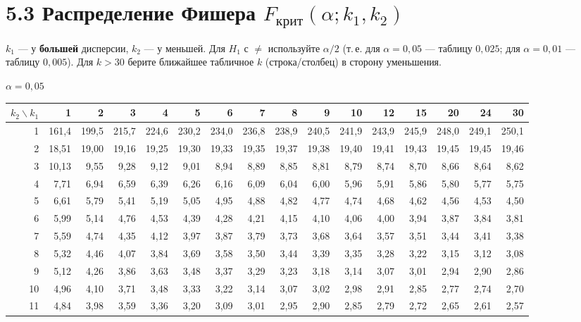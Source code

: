 \documentclass[a4paper,10pt]{extarticle}
\newcommand{\kr}{\text{крит}}\newcommand{\nab}{\text{набл}}
\begin{document}
\section*{5.3 Распределение Фишера $F_\kr(\alpha;k_1,k_2)$}
$k_1$ --- у \textbf{большей} дисперсии, $k_2$ --- у меньшей. Для $H_1$ с $\ne$ используйте $\alpha/2$ (т.\,е. для $\alpha=0{,}05$ --- таблицу $0{,}025$; для $\alpha=0{,}01$ --- таблицу $0{,}005$). Для $k>30$ берите ближайшее табличное $k$ (строка/столбец) в сторону уменьшения.\\
\scriptsize\renewcommand{\arraystretch}{0.86}\setlength{\tabcolsep}{2.6pt}
\begin{center}
\textbf{$\alpha=0{,}05$}\\[1pt]
\begin{tabular}{r|rrrrrrrrrrrrrrr}
$k_2\backslash k_1$ & 1 & 2 & 3 & 4 & 5 & 6 & 7 & 8 & 9 & 10 & 12 & 15 & 20 & 24 & 30\\\hline
1 & 161,4 & 199,5 & 215,7 & 224,6 & 230,2 & 234,0 & 236,8 & 238,9 & 240,5 & 241,9 & 243,9 & 245,9 & 248,0 & 249,1 & 250,1\\
2 & 18,51 & 19,00 & 19,16 & 19,25 & 19,30 & 19,33 & 19,35 & 19,37 & 19,38 & 19,40 & 19,41 & 19,43 & 19,45 & 19,45 & 19,46\\
3 & 10,13 & 9,55 & 9,28 & 9,12 & 9,01 & 8,94 & 8,89 & 8,85 & 8,81 & 8,79 & 8,74 & 8,70 & 8,66 & 8,64 & 8,62\\
4 & 7,71 & 6,94 & 6,59 & 6,39 & 6,26 & 6,16 & 6,09 & 6,04 & 6,00 & 5,96 & 5,91 & 5,86 & 5,80 & 5,77 & 5,75\\
5 & 6,61 & 5,79 & 5,41 & 5,19 & 5,05 & 4,95 & 4,88 & 4,82 & 4,77 & 4,74 & 4,68 & 4,62 & 4,56 & 4,53 & 4,50\\
6 & 5,99 & 5,14 & 4,76 & 4,53 & 4,39 & 4,28 & 4,21 & 4,15 & 4,10 & 4,06 & 4,00 & 3,94 & 3,87 & 3,84 & 3,81\\
7 & 5,59 & 4,74 & 4,35 & 4,12 & 3,97 & 3,87 & 3,79 & 3,73 & 3,68 & 3,64 & 3,57 & 3,51 & 3,44 & 3,41 & 3,38\\
8 & 5,32 & 4,46 & 4,07 & 3,84 & 3,69 & 3,58 & 3,50 & 3,44 & 3,39 & 3,35 & 3,28 & 3,22 & 3,15 & 3,12 & 3,08\\
9 & 5,12 & 4,26 & 3,86 & 3,63 & 3,48 & 3,37 & 3,29 & 3,23 & 3,18 & 3,14 & 3,07 & 3,01 & 2,94 & 2,90 & 2,86\\
10 & 4,96 & 4,10 & 3,71 & 3,48 & 3,33 & 3,22 & 3,14 & 3,07 & 3,02 & 2,98 & 2,91 & 2,85 & 2,77 & 2,74 & 2,70\\
11 & 4,84 & 3,98 & 3,59 & 3,36 & 3,20 & 3,09 & 3,01 & 2,95 & 2,90 & 2,85 & 2,79 & 2,72 & 2,65 & 2,61 & 2,57\\

\end{tabular}
\end{center}
\end{document}
